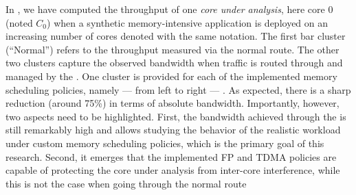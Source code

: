 In , we have computed the throughput of
one \emph{core under analysis}, here core 0 (noted $C_{0}$) when a
synthetic memory-intensive application is deployed on an increasing
number of cores denoted with the same notation. The first bar cluster
(``Normal'') refers to the throughput measured via the normal
route. The other two clusters capture the observed bandwidth when
traffic is routed through and managed by the \schim.
One cluster is provided for each of the implemented memory scheduling policies,
namely --- from left to right --- .
As expected, there is a sharp reduction (around 75\%) in terms of absolute
bandwidth. Importantly, however, two aspects need to be
highlighted. First, the bandwidth achieved through the \schim is still
remarkably high and allows studying the behavior of the realistic workload
under custom memory scheduling policies, which is the primary goal of
this research. Second, it emerges that the implemented FP and TDMA
policies are capable of protecting the core under analysis from
inter-core interference, while this is not the case when going through
the normal route




